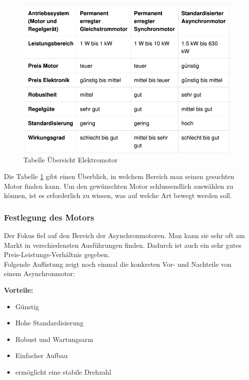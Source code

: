 \begin{figure}[H]
\begin{center}
	\includegraphics[width=1\textwidth]{fig/TabelleMotor}
	\caption{Tabelle Übersicht Elektromotor \label{fig:ueberschichtElektromotor} \cite{tabelleMotor}}
\end{center}
\end{figure}

Die Tabelle \ref{fig:ueberschichtElektromotor} gibt einen Überblick, in welchem Bereich man seinen gesuchten Motor finden kann. 
Um den gewünschten Motor schlussendlich auswählen zu können, ist es erforderlich zu wissen, was auf welche Art bewegt werden soll.

\subsubsection{Festlegung des Motors}
\label{sec:festlegungDesMotors}

Der Fokus fiel auf den Bereich der Asynchronmotoren. Man kann sie sehr oft am Markt in verschiedensten Ausführungen finden. Dadurch ist auch ein sehr gutes Preis-Leistungs-Verhältnis gegeben. 
\\
Folgende Auflistung zeigt noch einmal die konkreten Vor- und Nachteile von einem Asynchronmotor:
\newpage

\textbf{Vorteile:}

\begin{itemize}
	\item{Günstig}
	\item{Hohe Standardisierung}
	\item{Robust und Wartungsarm}
	\item{Einfacher Aufbau}
	\item{ermöglicht eine stabile Drehzahl}
\end{itemize}

